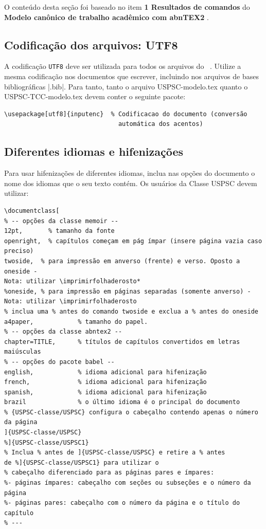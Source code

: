 O conteúdo desta seção foi baseado no item \textbf{1 Resultados de comandos} do \textbf{Modelo canônico de trabalho acadêmico com abnTEX2} \cite{equipeabntex2}.

\subsection{Codificação dos arquivos: UTF8}

A codificação \texttt{UTF8} deve ser utilizada para todos os arquivos do \abnTeX\ . Utilize a mesma codificação nos documentos que escrever, incluindo nos arquivos de bases bibliográficas |.bib|. Para tanto, tanto o arquivo USPSC-modelo.tex  quanto o USPSC-TCC-modelo.tex devem conter o seguinte pacote:

\begin{verbatim}
\usepackage[utf8]{inputenc}	 % Codificacao do documento (conversão
                               automática dos acentos)
\end{verbatim}

\subsection{Diferentes idiomas e hifenizações}
\label{sec-hifenizacao}

Para usar hifenizações de diferentes idiomas, inclua nas opções do documento o
nome dos idiomas que o seu texto contém. Os usuários da Classe USPSC devem utilizar:

\begin{verbatim}
\documentclass[
% -- opções da classe memoir --
12pt,		% tamanho da fonte
openright,	% capítulos começam em pág ímpar (insere página vazia caso 
preciso)
twoside,  % para impressão em anverso (frente) e verso. Oposto a oneside - 
Nota: utilizar \imprimirfolhaderosto*
%oneside, % para impressão em páginas separadas (somente anverso) -  
Nota: utilizar \imprimirfolhaderosto
% inclua uma % antes do comando twoside e exclua a % antes do oneside 
a4paper,			% tamanho do papel. 
% -- opções da classe abntex2 --
chapter=TITLE,		% títulos de capítulos convertidos em letras 
maiúsculas
% -- opções do pacote babel --
english,			% idioma adicional para hifenização
french,				% idioma adicional para hifenização
spanish,			% idioma adicional para hifenização
brazil				% o último idioma é o principal do documento
% {USPSC-classe/USPSC} configura o cabeçalho contendo apenas o número 
da página
]{USPSC-classe/USPSC}
%]{USPSC-classe/USPSC1}
% Inclua % antes de ]{USPSC-classe/USPSC} e retire a % antes 
de %]{USPSC-classe/USPSC1} para utilizar o 
% cabeçalho diferenciado para as páginas pares e ímpares:
%- páginas ímpares: cabeçalho com seções ou subseções e o número da página
%- páginas pares: cabeçalho com o número da página e o título do capítulo 
% ---
\end{verbatim}

